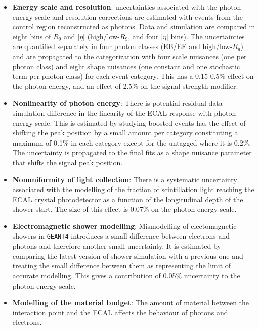 \begin{itemize}[noitemsep]
    \item {\textbf{Energy scale and resolution}: 
           uncertainties associated with the photon energy scale and resolution corrections
           are estimated with events from the \Zee control region reconstructed as photons. Data and simulation are compared in eight bins of $R_9$ and $|\eta|$ (high/low-$R_9$, and four $|\eta|$ bins). 
           The uncertainties are quantified separately in four photon classes (EB/EE and high/low-$R_9$) and are propagated to the categorization with four scale nuisances (one per photon class) and eight shape nuisances (one constant and one stochastic term per photon class) for each event category. 
           This has a 0.15-0.5\% effect on the photon energy, and an effect of 2.5\% on the signal strength modifier. 
           }
    \item {\textbf{Nonlinearity of photon energy}: 
          There is potential residual data-simulation difference in the linearity of the ECAL response with photon energy scale. 
          This is estimated by studying boosted \Zee events has the effect of shifting the peak position by a small amount per category constituting a maximum of 0.1\% in each category except for the untagged where it is 0.2\%. The uncertainty is propagated to the final fits as a shape nuisance parameter that shifts the signal peak position.
          }
    \item {\textbf{Nonuniformity of light collection}: 
           There is a systematic uncertainty associated with the modelling of the fraction of scintillation light reaching the ECAL crystal photodetector as a function of the longitudinal depth of the shower start. The size of this effect is 0.07\% on the photon energy scale.
           }
    \item {\textbf{Electromagnetic shower modelling}: 
        Mismodelling of electomagnetic showers in \texttt{GEANT4} introduces a small difference between electrons and photons and therefore another small uncertainty. 
           It is estimated by comparing the latest version of shower simulation with a previous one and treating the small difference between them as representing the limit of accurate modelling. 
           This gives a contribution of 0.05\% uncertainty to the photon energy scale.
           }
    \item {\textbf{Modelling of the material budget}: 
           The amount of material between the interaction point and the ECAL affects the behaviour of photons and electrons. 
}
\end{itemize}
